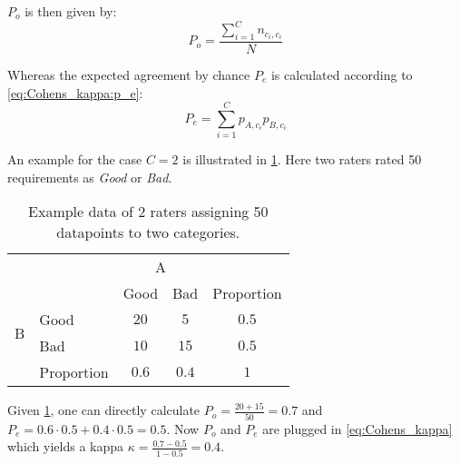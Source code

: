 $P_o$ is then given by: %
\begin{equation}\label{eq:Cohens_kappa:p_o}
    P_o = \frac{\sum_{i=1}^{C} n_{c_i, c_i}}{N}
\end{equation}

Whereas the expected agreement by chance $P_e$ is calculated according to \cref{eq:Cohens_kappa:p_e}:
\begin{equation}\label{eq:Cohens_kappa:p_e}
    P_e = \sum_{i=1}^{C} p_{A, c_i} p_{B, c_i}
\end{equation}

An example for the case $C=2$ is illustrated in \cref{tab:cohens_kappa_sample_data}.
Here two raters rated 50 requirements as \textit{Good} or \textit{Bad}.

\begin{table}[htpb]
    \centering
    \begin{tabular}{l|l|c|c|c}
        \multicolumn{2}{c}{}&\multicolumn{2}{c}{A}&\\
        \cline{3-4}
        \multicolumn{2}{c|}{}&Good&Bad&\multicolumn{1}{c}{Proportion}\\
        \cline{2-4}
        \multirow{2}{*}{B}& Good & $20$ & $5$ & $0.5$\\
        \cline{2-4}
        & Bad & $10$ & $15$ & $0.5$\\
        \cline{2-4}
        \multicolumn{1}{c}{} & \multicolumn{1}{c}{Proportion} & \multicolumn{1}{c}{$0.6$} & \multicolumn{    1}{c}{$0.4$} & \multicolumn{1}{c}{$1$}\\
    \end{tabular}
    \caption[Cohen's Kappa sample data]{Example data of 2 raters assigning 50 datapoints to two categories.}\label{tab:cohens_kappa_sample_data}
\end{table}

Given \cref{tab:cohens_kappa_sample_data}, one can directly calculate $P_o = \frac{ 20 + 15 }{50} = 0.7$ and $P_e = 0.6 \cdot 0.5 + 0.4 \cdot 0.5 = 0.5$.
Now $P_o$ and $P_e$ are plugged in \cref{eq:Cohens_kappa} which yields a kappa $\kappa = \frac{0.7 - 0.5}{1 - 0.5} = 0.4$.
